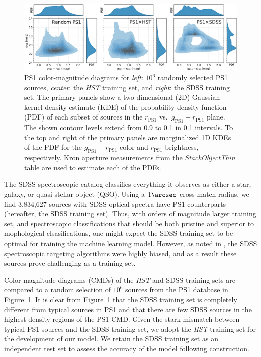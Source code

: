 \documentclass[twocolumn, dvipdfmx]{aastex62}
\begin{document}
\begin{CJK*}{UTF8}{gbsn}
\begin{figure}[htb]
 \centering
  \includegraphics[width=7.2in]{./Figures/ColorMagDiagram.pdf}
  \caption{ PS1 color-magnitude diagrams for \textit{left}: $10^6$ randomly
  selected PS1 sources, \textit{center}: the \textit{HST} training set, and
  \textit{right}: the SDSS training set. The primary panels show a
  two-dimensional (2D) Gaussian kernel density estimate (KDE) of the
  probability density function (PDF) of each subset of sources in the
  $r_\mathrm{PS1}$ vs.\ $g_\mathrm{PS1} - r_\mathrm{PS1}$ plane. The shown
  contour levels extend from 0.9 to 0.1 in 0.1 intervals. To the top and
  right of the primary panels are marginalized 1D KDEs of the PDF for the
  $g_\mathrm{PS1} - r_\mathrm{PS1}$ color and $r_\mathrm{PS1}$ brightness,
  respectively. Kron aperture measurements from the \textit{StackObjectThin}
  table are used to estimate each of the PDFs. }
  \label{fig:cmd}
\end{figure}

The SDSS spectroscopic catalog classifies everything it observes as either a
star, galaxy, or quasi-stellar object (QSO). Using a $1\arcsec$ cross-match
radius, we find 3,834,627 sources with SDSS optical spectra have PS1
counterparts (hereafter, the SDSS training set). Thus, with orders of
magnitude larger training set, and spectroscopic classifications that should
be both pristine and superior to mophological clsasifications, one might
expect the SDSS training set to be optimal for training the machine learning
model. However, as noted in \citet{Miller17}, the SDSS spectroscopic
targeting algorithms were highly biased, and as a result these sources prove
challenging as a training set.

Color-magnitude diagrams (CMDs) of the \textit{HST} and SDSS training sets
are compared to a random selection of $10^6$ sources from the PS1 database in
Figure~\ref{fig:cmd}. It is clear from Figure~\ref{fig:cmd} that the SDSS
training set is completely different from typical sources in PS1 and that
there are few SDSS sources in the highest density regions of the PS1 CMD.
Given the stark mismatch between typical PS1 sources and the SDSS training
set, we adopt the \textit{HST} training set for the development of our model.
We retain the SDSS training set as an independent test set to assess the
accuracy of the model following construction.


\end{CJK*}
\end{document}

